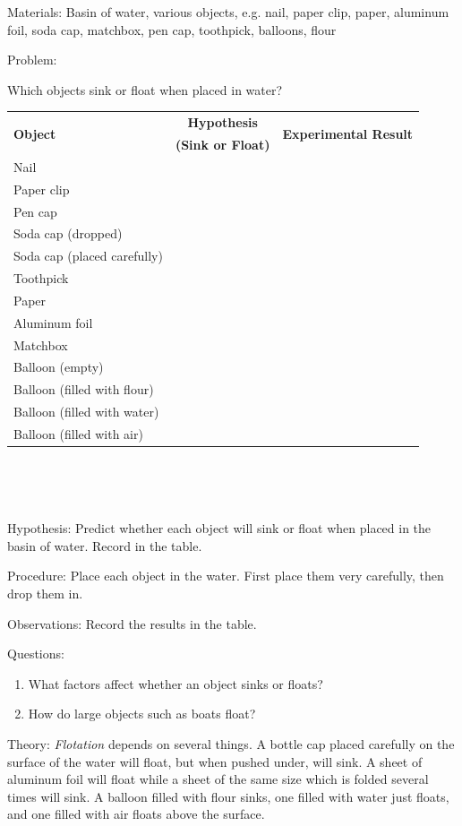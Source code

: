 
\begin{description*}
\item[Materials:]{Basin of water, various objects, e.g. nail, paper clip, paper, aluminum foil, soda cap, matchbox, pen cap, toothpick, balloons, flour}
\item[Problem:]{Which objects sink or float when placed in water?\\

\begin{tabular}{|l|c|c|} \hline
\multirow{2}{*}{\textbf{Object}} & \textbf{Hypothesis} & \multirow{2}{*}{\textbf{Experimental Result}} \\
& \textbf{(Sink or Float)} & \\ \hline
Nail& & \\ \hline
Paper clip& & \\ \hline
Pen cap& & \\ \hline
Soda cap (dropped)& & \\ \hline
Soda cap (placed carefully)& & \\ \hline
Toothpick & & \\ \hline
Paper& & \\ \hline
Aluminum foil& & \\ \hline
Matchbox& & \\ \hline
Balloon (empty)& & \\ \hline
Balloon (filled with flour)& & \\ \hline
Balloon (filled with water)& & \\ \hline
Balloon (filled with air)& & \\ \hline
\end{tabular} \\[10pt]
}\\
\item[Hypothesis:]{Predict whether each object will sink or float when placed in the basin of water. Record in the table.}
\item[Procedure:]{Place each object in the water. First place them very carefully, then drop them in.}
\item[Observations:]{Record the results in the table.}
\item[Questions:]{}\hfill
\begin{enumerate}
\item What factors affect whether an object sinks or floats?
\item How do large objects such as boats float?
\end{enumerate}
\item[Theory:]{\emph{Flotation} depends on several things. A bottle cap placed carefully on the surface of the water will float, but when pushed under, will sink. A sheet of aluminum foil will float while a sheet of the same size which is folded several times will sink. A balloon filled with flour sinks, one filled with water just floats, and one filled with air floats above the surface.\\

}
\end{description*}
